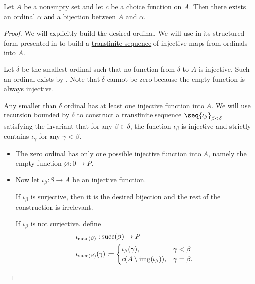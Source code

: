\begin{lemma}\label{thm:ordinal_bijection_and_choice}
  Let \( A \) be a nonempty set and let \( c \) be a \hyperref[def:choice_function]{choice function} on \( A \). Then there exists an ordinal \( \alpha \) and a bijection between \( A \) and \( \alpha \).
\end{lemma}
\begin{proof}
  We will explicitly build the desired ordinal. We will use  in its structured form presented in  to build a \hyperref[def:transfinite_sequence]{transfinite sequence} of injective maps from ordinals into \( A \).

  Let \( \delta \) be the smallest ordinal such that no function from \( \delta \) to \( A \) is injective. Such an ordinal exists by . Note that \( \delta \) cannot be zero because the empty function is always injective.

  Any smaller than \( \delta \) ordinal has at least one injective function into \( A \). We will use recursion bounded by \( \delta \) to construct a \hyperref[def:transfinite_sequence]{transfinite sequence} \( \seq{ \iota_\beta }_{\beta < \delta} \) satisfying the invariant that for any \( \beta \in \delta \), the function \( \iota_\beta \) is injective and strictly contains \( \iota_\gamma \) for any \( \gamma < \beta \).

  \begin{itemize}
    \item The zero ordinal has only one possible injective function into \( A \), namely the empty function \( \varnothing: 0 \to P \).

    \item Now let \( \iota_\beta: \beta \to A \) be an injective function.

    If \( \iota_\beta \) is surjective, then it is the desired bijection and the rest of the construction is irrelevant.

    If \( \iota_\beta \) is not surjective, define
    \begin{equation*}
      \begin{aligned}
        &\iota_{\operatorname{succ}(\beta)}: \operatorname{succ}(\beta) \to P \\
        &\iota_{\operatorname{succ}(\beta)}(\gamma) \coloneqq \begin{cases}
          \iota_\beta(\gamma),         &\gamma < \beta \\
          c(A \setminus \operatorname{img}(\iota_\beta)), &\gamma = \beta.
        \end{cases}
      \end{aligned}
    \end{equation*}


\end{itemize}
\end{proof}
